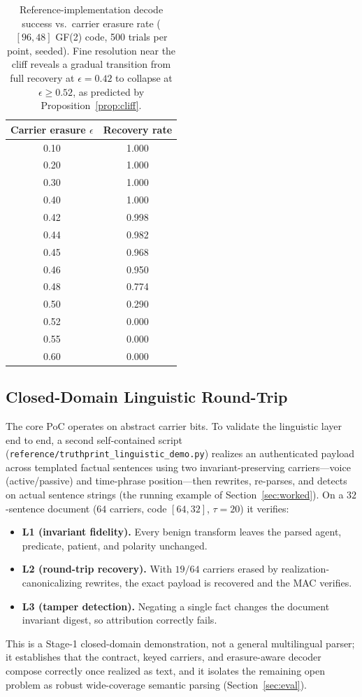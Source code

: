 \documentclass[11pt]{article}
\begin{document}
\begin{table}[t]
\centering
\caption{Reference-implementation decode success vs.\ carrier erasure rate
  ($[96,48]$ GF(2) code, 500 trials per point, seeded). Fine resolution
  near the cliff reveals a gradual transition from full recovery at
  $\epsilon=0.42$ to collapse at $\epsilon\ge0.52$, as predicted by
  Proposition~\ref{prop:cliff}.}
\label{tab:erasure}
\begin{tabular}{cc}
\toprule
Carrier erasure $\epsilon$ & Recovery rate \\
\midrule
0.10 & 1.000 \\
0.20 & 1.000 \\
0.30 & 1.000 \\
0.40 & 1.000 \\
0.42 & 0.998 \\
0.44 & 0.982 \\
0.45 & 0.968 \\
0.46 & 0.950 \\
0.48 & 0.774 \\
0.50 & 0.290 \\
0.52 & 0.000 \\
0.55 & 0.000 \\
0.60 & 0.000 \\
\bottomrule
\end{tabular}
\end{table}

\subsection{Closed-Domain Linguistic Round-Trip}
The core PoC operates on abstract carrier bits. To validate the linguistic
layer end to end, a second self-contained script
(\texttt{reference/\allowbreak truthprint\_\allowbreak linguistic\_\allowbreak demo.py}) realizes an authenticated
payload across templated factual sentences using two invariant-preserving
carriers---voice (active/passive) and time-phrase position---then rewrites,
re-parses, and detects on actual sentence strings (the running example of
Section~\ref{sec:worked}). On a $32$-sentence document ($64$ carriers, code
$[64,32]$, $\tau=20$) it verifies:
\begin{itemize}[leftmargin=*]
  \item \textbf{L1 (invariant fidelity).} Every benign transform leaves the
  parsed agent, predicate, patient, and polarity unchanged.
  \item \textbf{L2 (round-trip recovery).} With $19/64$ carriers erased by
  realization-canonicalizing rewrites, the exact payload is recovered and the
  MAC verifies.
  \item \textbf{L3 (tamper detection).} Negating a single fact changes the
  document invariant digest, so attribution correctly fails.
\end{itemize}
This is a Stage-1 closed-domain demonstration, not a general multilingual
parser; it establishes that the contract, keyed carriers, and erasure-aware
decoder compose correctly once realized as text, and it isolates the remaining
open problem as robust wide-coverage semantic parsing (Section~\ref{sec:eval}).
\end{document}

